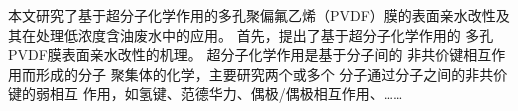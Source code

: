\begin{abstractZH}
    本文研究了基于超分子化学作用的多孔聚偏氟乙烯（PVDF）膜的表面亲水改性及其在处理低浓度含油废水中的应用。
首先，提出了基于超分子化学作用的
多孔PVDF膜表面亲水改性的机理。
超分子化学作用是基于分子间的
非共价键相互作用而形成的分子
聚集体的化学，主要研究两个或多个
分子通过分子之间的非共价键的弱相互
作用，如氢键、范德华力、偶极/偶极相互作用、……
\end{abstractZH}